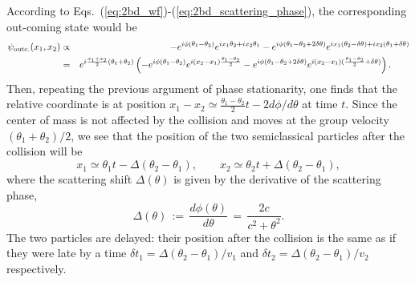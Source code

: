 \documentclass[onecolumn,amsfonts,showpacs,superscriptaddress]{revtex4-1}
\begin{document}
According to Eqs.~(\ref{eq:2bd_wf})-(\ref{eq:2bd_scattering_phase}), the corresponding out-coming state would be
\begin{eqnarray}
\nonumber	\psi_{{\rm outc.}} (x_1,x_2) & \propto &  - e^{i \phi(\theta_1 - \theta_2)}  e^{i x_1 \theta_2 + i x_2 \theta_1}    - e^{i \phi(\theta_1  - \theta_2 +2 \delta \theta )}  e^{i x_1 (\theta_2 - \delta \theta) + i x_2 (\theta_1 + \delta \theta ) }  \\
		& = & e^{i \frac{x_1+x_2}{2} (\theta_1 + \theta_2) } \left( - e^{i \phi (\theta_1 -\theta_2)} e^{i (x_2 - x_1) \frac{\theta_1 - \theta_2}{2} } - e^{i \phi (\theta_1 -\theta_2 + 2 \delta \theta)}  e^{i (x_2 - x_1) ( \frac{\theta_1 - \theta_2}{2} + \delta \theta) } \right)  . \qquad
\end{eqnarray}
Then, repeating the previous argument of phase stationarity, one finds that the relative coordinate is at position $x_1 - x_2 \simeq  \frac{\theta_1-\theta_2}{2} t - 2 d\phi/d\theta$ at time $t$. Since the center of mass is not affected by the collision and moves at the group velocity $(\theta_1+\theta_2)/2$, we see that the position of the two semiclassical particles after the collision will be
\begin{equation}
	x_1 \simeq \theta_1 t - \Delta (\theta_2- \theta_1) ,  \qquad x_2 \simeq \theta_2 t + \Delta (\theta_2- \theta_1)  , 
\end{equation}
where the scattering shift $\Delta (\theta)$ is given by the derivative of the scattering phase,
\begin{equation}
	\label{eq:scattering_phase}
	\Delta (\theta) \, := \, \frac{d\phi (\theta)}{d\theta}  \, = \, \frac{2c}{c^2 + \theta^2} .
\end{equation}
The two particles are delayed: their position after the collision is the same as if they were late by a time $\delta t_1 = \Delta(\theta_2- \theta_1)/v_1$ and $\delta t_2 = \Delta(\theta_2- \theta_1)/v_2$ respectively.
\end{document}
